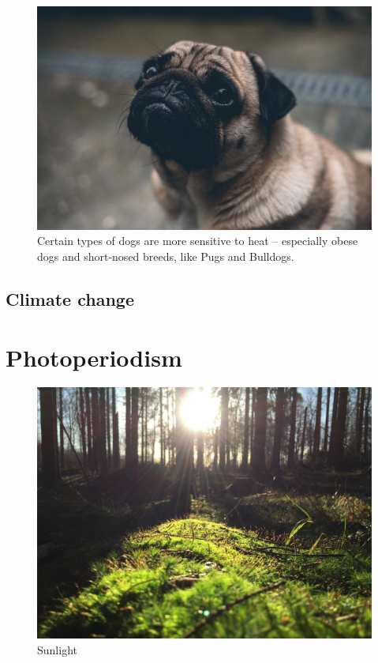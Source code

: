 \documentclass[]{book}
\begin{document}
\begin{figure}

{\centering \includegraphics[width=1\linewidth]{figures/pug} 

}

\caption{Certain types of dogs are more sensitive to heat – especially obese dogs and short-nosed breeds, like Pugs and Bulldogs.}\label{fig:heat-canine}
\end{figure}

\section{Climate change}\label{climate-change}

\chapter{Photoperiodism}\label{photoperiodism}

\begin{figure}

{\centering \includegraphics[width=1\linewidth]{figures/sunlight} 

}

\caption{Sunlight}\label{fig:sunlight}
\end{figure}
\end{document}
